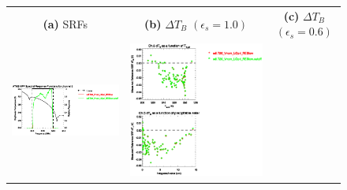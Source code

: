 \begin{figure}[H]
  \centering
  \begin{tabular}{c c c}
    \textsf{\textbf{(a)} SRFs} &
    \textsf{\textbf{(b)} $\Delta T_B$ $(\epsilon_s = 1.0)$} &
    \textsf{\textbf{(c)} $\Delta T_B$ $(\epsilon_s = 0.6)$} \\
    \includegraphics[bb=80 400 280 558,clip,scale=0.85]{graphics/srf/Rset/atms_npp.ch5.osrf.eps} &
    \includegraphics[bb=85 400 260 558,clip,scale=0.85]{graphics/dtb/Rset/e1.0_r0.0/atms_npp.ch5.dTb.eps} & 

\end{tabular}
\end{figure}
